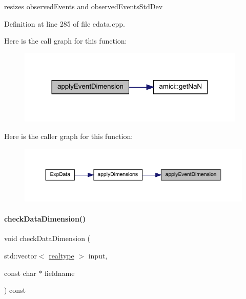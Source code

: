 resizes observed\+Events and observed\+Events\+Std\+Dev 

Definition at line 285 of file edata.\+cpp.

Here is the call graph for this function\+:
\nopagebreak
\begin{figure}[H]
\begin{center}
\leavevmode
\includegraphics[width=308pt]{classamici_1_1_exp_data_ae872e294aa6f34e90844905fd203eb16_cgraph}
\end{center}
\end{figure}
Here is the caller graph for this function\+:
\nopagebreak
\begin{figure}[H]
\begin{center}
\leavevmode
\includegraphics[width=350pt]{classamici_1_1_exp_data_ae872e294aa6f34e90844905fd203eb16_icgraph}
\end{center}
\end{figure}
\mbox{\label{classamici_1_1_exp_data_acad115e928a8b0bc8e90ebf9553d3eed}} 
\paragraph{\texorpdfstring{checkDataDimension()}{checkDataDimension()}}
{\footnotesize\ttfamily void check\+Data\+Dimension (\begin{DoxyParamCaption}\item[{std\+::vector$<$ \mbox{\hyperlink{namespaceamici_a1bdce28051d6a53868f7ccbf5f2c14a3}{realtype}} $>$}]{input,  }\item[{const char $\ast$}]{fieldname }\end{DoxyParamCaption}) const\hspace{0.3cm}{\ttfamily [protected]}}

